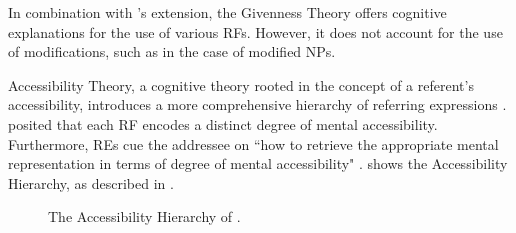 In combination with \citeauthor{Mulkern1996}'s extension, the Givenness Theory offers cognitive explanations for the use of various RFs. However, it does not account for the use of modifications, such as in the case of modified NPs. 

Accessibility Theory, a cognitive theory rooted in the concept of a referent's accessibility, introduces a more comprehensive hierarchy of referring expressions \citep{ariel1990accessing,ariel2001accessibility}. \citet{ariel1990accessing,ariel2001accessibility} posited that each RF encodes a distinct degree of mental accessibility. Furthermore, REs cue the addressee on ``how to retrieve the appropriate mental representation in terms of degree of mental accessibility" \citep[31]{ariel2001accessibility}.  shows the Accessibility Hierarchy, as described in \citet{ariel2001accessibility}.

\begin{figure}
	\caption{The Accessibility Hierarchy of \citet{ariel2001accessibility}.}\label{fig:accessibilityhierarchy}
\end{figure}

